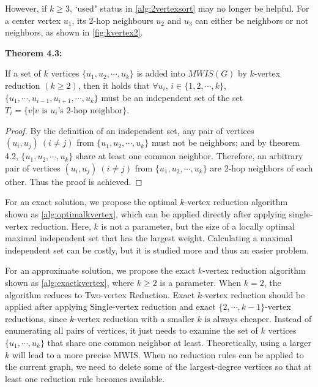 \documentclass[sigconf, nonacm]{acmart}
\begin{document}
However, if $k\geq 3$, `used" status in \autoref{alg:2vertexsort} may no longer be helpful. For a center vertex $u_1$, its 2-hop neighbours $u_2$ and $u_3$ can either be neighbors or not neighbors, as shown in \autoref{fig:kvertex2}.

\begin{framed}
\noindent\textbf{Theorem 4.3:}

If a set of $k$ vertices $\{u_1, u_2, \cdots, u_k\}$ is added into $MWIS(G)$ by $k$-vertex reduction $(k\geq 2)$, then it holds that $\forall u_i$, $i\in\{1,2,\cdots,k\}$, $\{u_1, \cdots, u_{i-1}, u_{i+1}, \cdots, u_k\}$ must be an independent set of the set $T_i=\{v | v \text{ is }u_i\text{'s 2-hop neighbor}\}$.
\end{framed}

\begin{proof}
By the definition of an independent set, any pair of vertices $(u_i, u_j)\ (i\neq j)$ from $\{u_1, u_2, \cdots, u_k\}$ must not be neighbors; and by theorem 4.2, $\{u_1, u_2, \cdots, u_k\}$ share at least one common neighbor. Therefore, an arbitrary pair of vertices $(u_i, u_j)\ (i\neq j)$ from $\{u_1, u_2, \cdots, u_k\}$ are 2-hop neighbors of each other. Thus the proof is achieved.
\end{proof}

For an exact solution, we propose the optimal $k$-vertex reduction algorithm shown as \autoref{alg:optimalkvertex}, which can be applied directly after applying single-vertex reduction. Here, $k$ is not a parameter, but the size of a locally optimal maximal independent set that has the largest weight. Calculating a maximal independent set can be costly, but it is studied more and thus an easier problem.

For an approximate solution, we propose the exact $k$-vertex reduction algorithm shown as \autoref{alg:exactkvertex}, where $k\geq 2$ is a parameter. When $k=2$, the algorithm reduces to Two-vertex Reduction. Exact $k$-vertex reduction should be applied after applying Single-vertex reduction and exact $\{2,\cdots,k-1\}$-vertex reductions, since $k$-vertex reduction with a smaller $k$ is always cheaper. Instead of enumerating all pairs of vertices, it just needs to examine the set of $k$ vertices $\{u_1,\cdots,u_k\}$ that share one common neighbor at least. Theoretically, using a larger $k$ will lead to a more precise MWIS. When no reduction rules can be applied to the current graph, we need to delete some of the largest-degree vertices so that at least one reduction rule becomes available.
\end{document}
